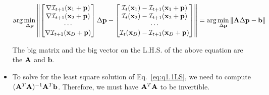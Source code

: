 \documentclass[11pt]{article}
\begin{document}
\begin{itemize}
  \begin{align} \label{eq:q1.1LS}
      \arg\min_{\Delta \mathbf{p}}
      \left \|
      \begin{bmatrix}
          \nabla \mathcal{I}_{t+1}(\mathbf{x}_1+\mathbf{p}) \\
          \nabla \mathcal{I}_{t+1}(\mathbf{x}_2+\mathbf{p}) \\
          \cdots\\
          \nabla \mathcal{I}_{t+1}(\mathbf{x}_D+\mathbf{p})
      \end{bmatrix}
      \Delta \mathbf{p} -
      \begin{bmatrix}
          \mathcal{I}_t(\mathbf{x}_1) - \mathcal{I}_{t+1} (\mathbf{x}_1+\mathbf{p})\\
          \mathcal{I}_t(\mathbf{x}_2) - \mathcal{I}_{t+1} (\mathbf{x}_2+\mathbf{p})\\
          \cdots\\
          \mathcal{I}_t(\mathbf{x}_D) - \mathcal{I}_{t+1} (\mathbf{x}_D+\mathbf{p})\\
      \end{bmatrix}
      \right \|
      =
      \arg\min_{\Delta \mathbf{p}}
      \| \mathbf{A}\Delta\mathbf{p} - \mathbf{b} \|
  \end{align}

  The big matrix and the big vector on the L.H.S. of the above equation are the $\mathbf{A}$ and $\mathbf{b}$.

  \item To solve for the least square solution of Eq.~\ref{eq:q1.1LS}, we need to compute $(\mathbf{A}^T\mathbf{A})^{-1}\mathbf{A}^T\mathbf{b}$. Therefore, we must have $\mathbf{A}^T\mathbf{A}$ to be invertible.
\end{itemize}
\end{document}

